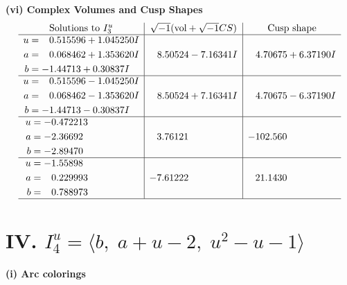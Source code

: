 \documentclass[1p]{elsarticle_modified}
\theoremstyle{definition}
\newcommand{\I}{\sqrt{-1}}
\begin{document}
\newpage\flushleft \textbf{(vi) Complex Volumes and Cusp Shapes}
$$\begin{array}{c|c|c}  
\text{Solutions to }I^u_{3}& \I (\text{vol} + \sqrt{-1}CS) & \text{Cusp shape}\\
 \hline 
\begin{aligned}
u &= \phantom{-}0.515596 + 1.045250 I \\
a &= \phantom{-}0.068462 + 1.353620 I \\
b &= -1.44713 + 0.30837 I\end{aligned}
 & \phantom{-}8.50524 - 7.16341 I & \phantom{-}4.70675 + 6.37190 I \\ \hline\begin{aligned}
u &= \phantom{-}0.515596 - 1.045250 I \\
a &= \phantom{-}0.068462 - 1.353620 I \\
b &= -1.44713 - 0.30837 I\end{aligned}
 & \phantom{-}8.50524 + 7.16341 I & \phantom{-}4.70675 - 6.37190 I \\ \hline\begin{aligned}
u &= -0.472213\phantom{ +0.000000I} \\
a &= -2.36692\phantom{ +0.000000I} \\
b &= -2.89470\phantom{ +0.000000I}\end{aligned}
 & \phantom{-}3.76121\phantom{ +0.000000I} & -102.560\phantom{ +0.000000I} \\ \hline\begin{aligned}
u &= -1.55898\phantom{ +0.000000I} \\
a &= \phantom{-}0.229993\phantom{ +0.000000I} \\
b &= \phantom{-}0.788973\phantom{ +0.000000I}\end{aligned}
 & -7.61222\phantom{ +0.000000I} & \phantom{-}21.1430\phantom{ +0.000000I}\\
 \hline 
 \end{array}$$\newpage\newpage\renewcommand{\arraystretch}{1}
\centering \section*{IV. $I^u_{4}= \langle b,\;a+u-2,\;u^2- u-1 \rangle$}
\flushleft \textbf{(i) Arc colorings}\\
\end{document}
